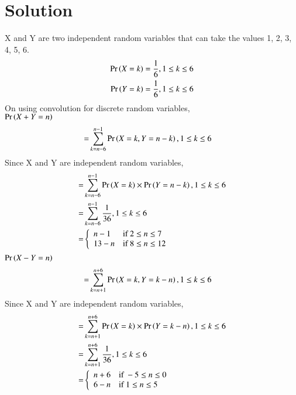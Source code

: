 \documentclass[journal,12pt,twocolumn]{IEEEtran}
\begin{document}
\section*{Solution}
X and Y are two independent random variables that can take the values 1, 2, 3, 4, 5, 6.
\begin{align}
    \Pr\left(X=k\right)=\frac{1}{6}, 1\leq k \leq 6\\
    \Pr\left(Y=k\right)=\frac{1}{6}, 1\leq k \leq 6
\end{align}
\newline
On using convolution for discrete random variables,\\
$\Pr\left(X+Y=n\right)$
\begin{align}
    =&\sum_{k=n-6}^{n-1} \Pr\left(X=k,Y=n-k\right), 1\leq k \leq 6
\end{align}
Since X and Y are independent random variables,
\begin{align}
    =&\sum_{k=n-6}^{n-1} \Pr\left(X=k\right)\times\Pr\left(Y=n-k\right), 1\leq k \leq 6\\
    =&\sum_{k=n-6}^{n-1} \frac{1}{36}, 1\leq k \leq 6\label{0.0.12}\\
    =&
    \left\{
	        \begin{array}{ll}
		    n-1  & \mbox{if } 2 \leq n \leq 7 \\
		    13-n & \mbox{if } 8 \leq n \leq 12
	        \end{array}
    \right.
\end{align}
$\Pr\left(X-Y=n\right)$
\begin{align}
    =&\sum_{k=n+1}^{n+6} \Pr\left(X=k,Y=k-n\right), 1\leq k \leq 6
\end{align}
Since X and Y are independent random variables,
\begin{align}
    =&\sum_{k=n+1}^{n+6} \Pr\left(X=k\right)\times\Pr\left(Y=k-n\right), 1\leq k \leq 6\\
    =&\sum_{k=n+1}^{n+6} \frac{1}{36}, 1\leq k \leq 6\label{0.0.16}\\
    =&
    \left\{
	        \begin{array}{ll}
		    n+6 & \mbox{if } -5 \leq n \leq 0 \\
		    6-n & \mbox{if } 1  \leq n \leq 5
	        \end{array}
    \right.
\end{align}
\newline
\end{document}
